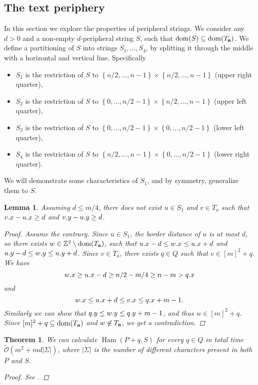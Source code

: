 \documentclass[11pt]{article}
\newcommand{\Z}{\mathbb{Z}}
\newcommand{\tO}{\tilde{\mathcal{O}}}
\newcommand{\set}[1]{\left\lbrace #1 \right\rbrace}
\theoremstyle{plain}
\newtheorem{theorem}{Theorem}
\newtheorem{lemma}{Lemma}
\theoremstyle{definition}
\theoremstyle{remark}
\DeclareMathOperator*{\Ham}{Ham}
\begin{document}
\subsection{The text periphery}
In this section we explore the properties of peripheral strings.
We consider any $d > 0$ and a non-empty $d$-peripheral string $S$, such that $\operatorname*{dom}(S) \subseteq \operatorname*{dom}(T_\mathbf{a})$.
We define a partitioning of $S$ into strings $S_1, \dots, S_4$, by splitting it through the middle with a horizontal and vertical line. 
Specifically
\begin{itemize}
	\item $S_1$ is the restriction of $S$ to $\set{n / 2, \dots, n - 1} \times \set{n / 2, \dots, n - 1}$ (upper right quarter),
	\item $S_2$ is the restriction of $S$ to $\set{0, \dots, n / 2 - 1} \times \set{n / 2, \dots, n - 1}$ (upper left quarter),
	\item $S_3$ is the restriction of $S$ to $\set{0, \dots, n / 2 - 1} \times \set{0, \dots, n / 2 - 1}$ (lower left quarter),
	\item $S_4$ is the restriction of $S$ to $\set{n / 2, \dots, n - 1} \times \set{0, \dots, n / 2 - 1}$ (lower right quarter).
\end{itemize}
We will demonstrate some characteristics of $S_1$, and by symmetry, generalize them to $S$.

\begin{lemma} \label{border_lemma}
	Assuming $d \le m/4$, there does not exist $u \in S_1$ and $v \in T_a$ such that $v.x - u.x \ge d$ and $v.y - u.y \ge d$.
	\begin{proof}
		Assume the contrary.
		Since $u \in S_1$, the border distance of $u$ is at most $d$, so there exists $w \in \Z^2 \setminus \d{\Ta}$, such that
		$u.x - d \le w.x \le u.x + d$ and
		$u.y - d \le w.y \le u.y + d$.
		Since $v \in T_a$, there exists $q \in Q$ such that $v \in [m]^2 + q$.
		We have
		$$ w.x \ge u.x - d \ge n / 2 - m / 4 \ge n - m > q.x $$
		and
		$$ w.x \le u.x + d \le v.x \le q.x + m - 1. $$
		Similarly we can show that $q.y \le w.y \le q.y + m - 1$, and thus $w \in [m]^2 + q$.
		Since $[m]^2 + q \subseteq \operatorname*{dom}(T_\mathbf{a})$ and $w \not \in T_\mathbf{a}$, we get a contradiction.
	\end{proof}
\end{lemma}

\begin{theorem}\label{sigma_border}
	We can calculate $\Ham(P + q, S)$ for every $q \in Q$ in total time $\tO(m^2 + md |\Sigma|)$, where $|\Sigma|$ is the number of different characters present in both $P$ and $S$.
	\begin{proof} See . \end{proof}
\end{theorem}
\end{document}

